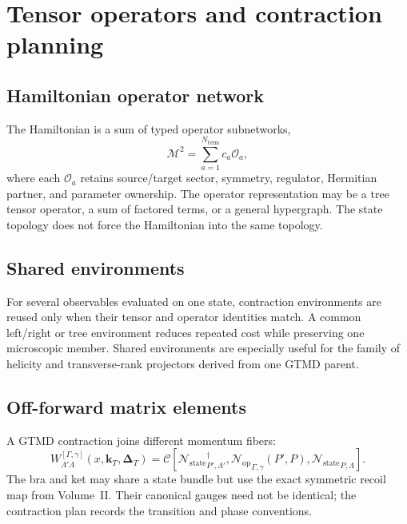 \documentclass[11pt]{article}
\newcommand{\kT}{\bm{k}_{T}}
\newcommand{\DT}{\bm{\Delta}_{T}}
\newcommand{\cO}{\mathcal O}
\newcommand{\cM}{\mathcal M}
\newcommand{\cC}{\mathcal C}
\newcommand{\Nstate}{\mathcal N_{\mathrm{state}}}
\newcommand{\Nop}{\mathcal N_{\mathrm{op}}}
\begin{document}
\section{Tensor operators and contraction planning}
\label{sec:operator-networks}

\subsection{Hamiltonian operator network}

The Hamiltonian is a sum of typed operator subnetworks,
\begin{equation}
 \cM^2=
 \sum_{a=1}^{N_{\mathrm{term}}}
 c_a\cO_a,
\label{eq:hamiltonian-sum-network}
\end{equation}
where each \(\cO_a\) retains source/target sector, symmetry, regulator,
Hermitian partner, and parameter ownership.  The operator representation may
be a tree tensor operator, a sum of factored terms, or a general hypergraph.
The state topology does not force the Hamiltonian into the same topology.

\subsection{Shared environments}

For several observables evaluated on one state, contraction environments are
reused only when their tensor and operator identities match.  A common
left/right or tree environment reduces repeated cost while preserving one
microscopic member.  Shared environments are especially useful for the family
of helicity and transverse-rank projectors derived from one GTMD parent.

\subsection{Off-forward matrix elements}

A GTMD contraction joins different momentum fibers:
\begin{equation}
 W_{\Lambda'\Lambda}^{[\Gamma,\gamma]}
 (x,\kT,\DT)
 =
 \cC\left[
 {\Nstate}_{P',\Lambda'}^{\dagger},
 {\Nop}_{\Gamma,\gamma}(P',P),
 {\Nstate}_{P,\Lambda}
 \right].
\label{eq:gtmd-tn-contraction}
\end{equation}
The bra and ket may share a state bundle but use the exact symmetric recoil map
from Volume~II.  Their canonical gauges need not be identical; the contraction
plan records the transition and phase conventions.
\end{document}
